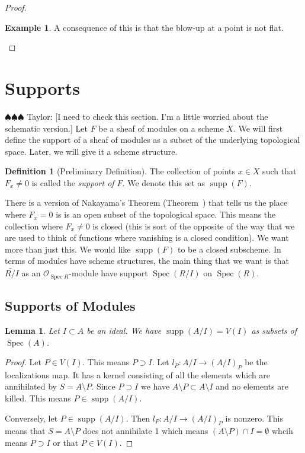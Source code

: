 \documentclass[12pt]{article}
\numberwithin{equation}{section}
\newtheorem{lemma}[theorem]{Lemma}
\theoremstyle{definition}
\newtheorem{definition}[theorem]{Definition}
\newtheorem{example}[theorem]{Example}
\theoremstyle{remark}
\newcommand{\Ocal}{\mathcal{O}}
\newcommand{\Spec}{\operatorname{Spec}}
\newcommand{\supp}{\operatorname{supp}}
\newcommand{\taylor}[1]{{\color{blue} \sf $\spadesuit\spadesuit\spadesuit$ Taylor: [#1]}}
\begin{document}
\begin{proof}
\begin{example}
	A consequence of this is that the blow-up at a point is not flat. 
\end{example}

\end{proof}

\section{Supports}

\taylor{I need to check this section. I'm a little worried about the schematic version.}
Let $F$ be a sheaf of modules on a scheme $X$. 
We will first define the support of a sheaf of modules as a subset of the underlying topological space. 
Later, we will give it a scheme structure. 
\begin{definition}[Preliminary Definition]
	The collection of points $x\in X$ such that $F_x\neq 0$ is called the \emph{support of $F$}. We denote this set as $\supp(F)$.
\end{definition}

There is a version of Nakayama's Theorem (Theorem~\label{thm:nakayama-vanishing}) that tells us the place where $F_x=0$ is is an open subset of the topological space. 
This means the collection where $F_x\neq 0$ is closed (this is sort of the opposite of the way that we are used to think of functions where vanishing is a closed condition).
We want more than just this. 
We would like $\supp(F)$ to be a closed subscheme. 
In terms of modules have scheme structures, the main thing that we want is that $\widetilde{R/I}$ as an $\Ocal_{\Spec R}$-module have support $\Spec(R/I)$ on $\Spec(R)$.

\subsection{Supports of Modules}

\begin{lemma}
	Let $I\subset A$ be an ideal. 
	We have $\supp(A/I) = V(I)$ as subsets of $\Spec(A)$.
\end{lemma}
\begin{proof}
	Let $P\in V(I)$. This means $P\supset I$. 
	Let $l_P: A/I \to (A/I)_P$ be the localizations map.
	It has a kernel consisting of all the elements which are annihilated by $S = A\setminus P$. 
	Since $P \supset I$ we have $A\setminus P \subset A\setminus I$ and no elements are killed. 
	This means $P\in \supp(A/I).$
	
	Conversely, let $P \in \supp(A/I)$. 
	Then $l_P: A/I \to (A/I)_P$ is nonzero. 
	This means that $S=A\setminus P$ does not annihilate 1 which means $(A\setminus P)\cap I = \emptyset$ whcih means $P \supset I$ or that $P \in V(I)$.
\end{proof}
\end{document}
